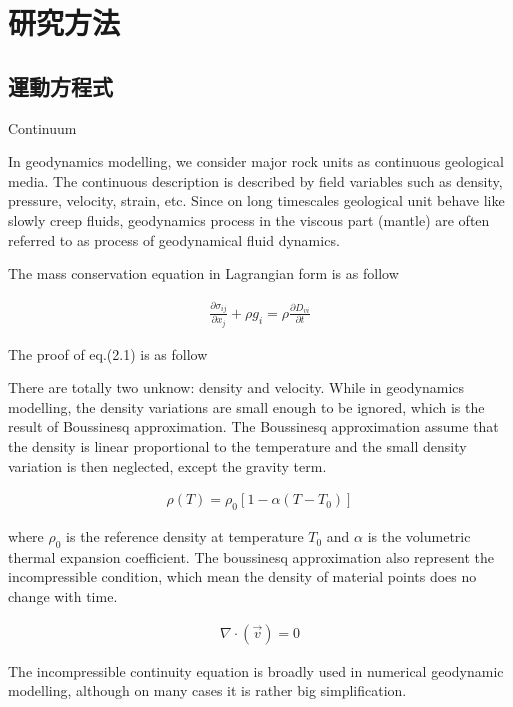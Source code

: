 
\chapter{研究方法}

\section{運動方程式}

Continuum

In geodynamics modelling, we consider major rock units as continuous geological media. The continuous description is described by field variables such as density, pressure, velocity, strain, etc. Since on long timescales geological unit behave like slowly creep fluids, geodynamics process in the viscous part (mantle) are often referred to as process of geodynamical fluid dynamics. 

The mass conservation equation in Lagrangian form is as follow

\begin{align}
\frac{\partial \sigma_{ij}}{\partial x_j}+\rho g_i = \rho \frac{\partial D_{vi}}{\partial t} 
\end{align}

The proof of eq.(2.1) is as follow

There are totally two unknow: density and velocity.
While in geodynamics modelling, the density variations are small enough to be ignored, which is the result of Boussinesq approximation. The Boussinesq approximation assume that the density is linear proportional to the temperature and the small density variation is then neglected, except the gravity term.

\begin{align}
\rho (T) = \rho_0[1-\alpha (T-T_0)] 
\end{align}

where $\rho_0$ is the reference density at temperature $T_0$ and $\alpha$ is the volumetric thermal expansion coefficient. The boussinesq approximation also represent the incompressible condition, which mean the density of material points does no change with time. 

\begin{align}
\nabla \cdot (\vec v) = 0 
\end{align}

The incompressible continuity equation is broadly used in numerical geodynamic modelling, although on many cases it is rather big simplification. 


